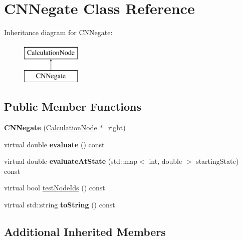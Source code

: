 \hypertarget{classCNNegate}{}\section{C\+N\+Negate Class Reference}
\label{classCNNegate}
Inheritance diagram for C\+N\+Negate\+:\begin{figure}[H]
\begin{center}
\leavevmode
\includegraphics[height=2.000000cm]{classCNNegate}
\end{center}
\end{figure}
\subsection*{Public Member Functions}
\begin{DoxyCompactItemize}
\item 
{\bfseries C\+N\+Negate} (\hyperlink{classCalculationNode}{Calculation\+Node} $\ast$\+\_\+right)\hypertarget{classCNNegate_a7ed8699cfcdf9e6cb4e08c2f386ec8aa}{}\label{classCNNegate_a7ed8699cfcdf9e6cb4e08c2f386ec8aa}

\item 
virtual double {\bfseries evaluate} () const \hypertarget{classCNNegate_ad8742ef807da75fea0d512467d5331cd}{}\label{classCNNegate_ad8742ef807da75fea0d512467d5331cd}

\item 
virtual double {\bfseries evaluate\+At\+State} (std\+::map$<$ int, double $>$ starting\+State) const \hypertarget{classCNNegate_a466eaeee589ea62f77dab230b4da9ab7}{}\label{classCNNegate_a466eaeee589ea62f77dab230b4da9ab7}

\item 
virtual bool \hyperlink{classCNNegate_ad03475bf5217a1673057e74f60b7b7fe}{test\+Node\+Ids} () const 
\item 
virtual std\+::string {\bfseries to\+String} () const \hypertarget{classCNNegate_a8cf6b243b14cfbeb28434f301303d1a9}{}\label{classCNNegate_a8cf6b243b14cfbeb28434f301303d1a9}

\end{DoxyCompactItemize}
\subsection*{Additional Inherited Members}


